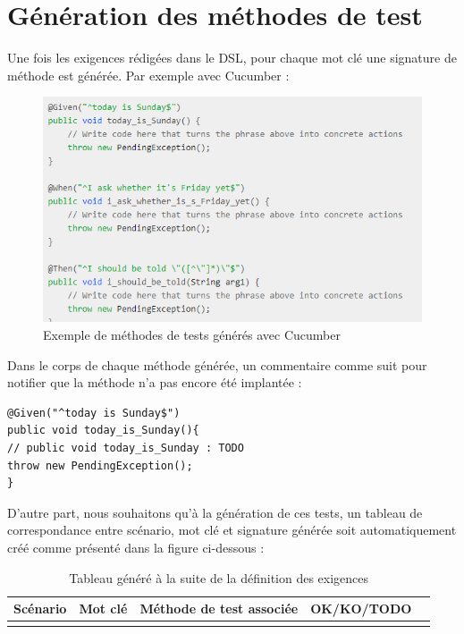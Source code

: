 \section{Génération des méthodes de test}

Une fois les exigences rédigées dans le DSL, pour chaque mot clé une signature de méthode est générée. Par exemple avec Cucumber : 

            \begin{figure}[H]
                \centering
                \includegraphics[width=\textwidth]{images/fixture.PNG}
                \caption{Exemple de méthodes de tests générés avec Cucumber}
            \end{figure}

Dans le corps de chaque méthode générée, un commentaire comme suit pour notifier que la méthode n'a pas encore été implantée :

\begin{lstlisting}
@Given("^today is Sunday$")
public void today_is_Sunday(){
// public void today_is_Sunday : TODO 
throw new PendingException();
}
\end{lstlisting}

D'autre part, nous souhaitons qu’à la génération de ces tests, un tableau de correspondance entre scénario, mot clé et signature générée soit automatiquement créé comme présenté dans la figure ci-dessous :

      \begin{table}[H]
        \centering
         \begin{tabular}{|c|c|c|c|c|} 
         \hline
        Scénario & Mot clé & Méthode de test associée & OK/KO/TODO \\ [0.5ex] 
         \hline
          & & \\
         \hline
        \end{tabular}
        \caption{Tableau généré à la suite de la définition des exigences}
        \end{table}
    
